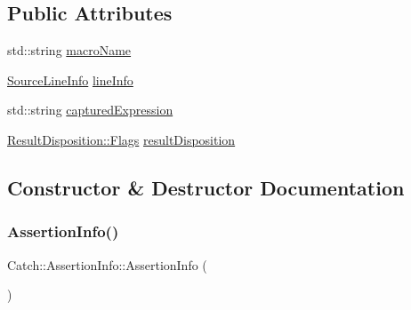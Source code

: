 \subsection*{Public Attributes}
\begin{DoxyCompactItemize}
\item 
std\+::string \hyperlink{struct_catch_1_1_assertion_info_ac2e59e8c89e00eb3390768f50d540b18}{macro\+Name}
\item 
\hyperlink{struct_catch_1_1_source_line_info}{Source\+Line\+Info} \hyperlink{struct_catch_1_1_assertion_info_a17bdbb404ba12658034f833be2f4c3e7}{line\+Info}
\item 
std\+::string \hyperlink{struct_catch_1_1_assertion_info_af7c1d3cbfa346e9a303030fa0ef0cb54}{captured\+Expression}
\item 
\hyperlink{struct_catch_1_1_result_disposition_a3396cad6e2259af326b3aae93e23e9d8}{Result\+Disposition\+::\+Flags} \hyperlink{struct_catch_1_1_assertion_info_a60353b3632ab2f827162f2b2d6911073}{result\+Disposition}
\end{DoxyCompactItemize}


\subsection{Constructor \& Destructor Documentation}
\hypertarget{struct_catch_1_1_assertion_info_a15c29d306c86361f842a0351a6003b9f}{}\label{struct_catch_1_1_assertion_info_a15c29d306c86361f842a0351a6003b9f} 
\subsubsection{\texorpdfstring{Assertion\+Info()}{AssertionInfo()}\hspace{0.1cm}{\footnotesize\ttfamily [1/2]}}
{\footnotesize\ttfamily Catch\+::\+Assertion\+Info\+::\+Assertion\+Info (\begin{DoxyParamCaption}{ }\end{DoxyParamCaption})\hspace{0.3cm}{\ttfamily [inline]}}

\hypertarget{struct_catch_1_1_assertion_info_aaf6cc3eebd40391e54d37ed42953c73f}{}\label{struct_catch_1_1_assertion_info_aaf6cc3eebd40391e54d37ed42953c73f} 
